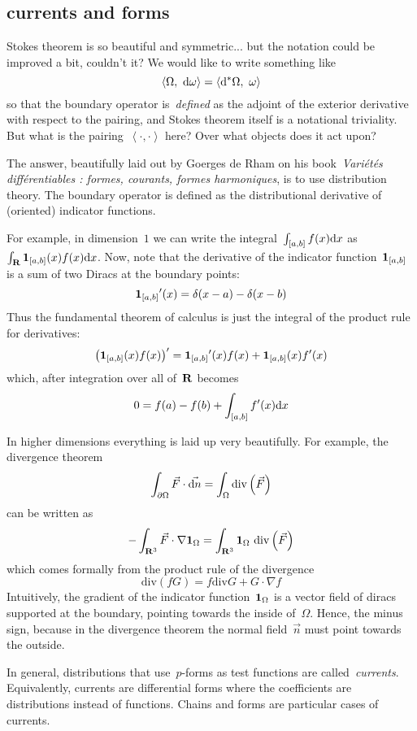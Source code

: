 \clearpage
\subsection{currents and forms}

Stokes theorem is so beautiful and symmetric... but the
notation could be improved a bit, couldn't it?  We would like to write
something like
\[
	\left\langle
	\Omega,\ \mathrm{d}\omega
	\right\rangle
	=
	\left\langle
	\mathrm{d}^*\Omega,\ \omega
	\right\rangle
\]
so that the boundary operator is~\emph{defined} as the adjoint of the
exterior derivative with respect to the pairing, and Stokes theorem itself is
a notational triviality.  But what is the
pairing~$\left\langle\cdot,\cdot\right\rangle$ here?  Over what objects does
it act upon?

The answer, beautifully laid out by Goerges de Rham
on his book~\emph{Variétés différentiables : formes,
courants, formes harmoniques}, is to use distribution theory.  The boundary
operator is defined as the distributional derivative of (oriented) indicator
functions.

For example, in dimension~$1$ we can write the integral~$\int_{[a,b]}f(x)\mathrm{d} x$
as~$\int_{\mathbf{R}}\mathbf{1}_{[a,b]}(x)f(x)\mathrm{d} x$.  Now, note that the derivative of the
indicator function~$\mathbf{1}_{[a,b]}$ is a sum of two Diracs at the boundary points:
\[
	{\mathbf{1}_{[a,b]}}'(x)=\delta(x-a)-\delta(x-b)
\]
Thus the fundamental theorem of calculus is just the integral of the product
rule for derivatives:
\[
	\left(\mathbf{1}_{[a,b]}(x)f(x)\right)'={\mathbf{1}_{[a,b]}}'(x)f(x)+\mathbf{1}_{[a,b]}(x)f'(x)
\]
which, after integration over all of~$\mathbf{R}$ becomes
\[
	0 = f(a)-f(b)+\int_{[a,b]}f'(x)\mathrm{d} x
\]

In higher dimensions everything is laid up very beautifully.  For example,
the divergence theorem
\[
	\int_{\partial\Omega} \vec F\cdot\vec{\mathrm{d} n} =
	\int_\Omega\mathrm{div}\left(\vec F\right)
\]
can be written as
\[
	-\int_{\mathbf{R}^3}
	\vec F\cdot \nabla\mathbf{1}_\Omega
	=
	\int_{\mathbf{R}^3}
	\mathbf{1}_\Omega\ \mathrm{div}\left(\vec F\right)
\]
which comes formally from the product rule of the divergence
\[
	\mathrm{div}\left(fG\right)=f\mathrm{div}G+G\cdot\nabla f
\]
Intuitively, the gradient of the indicator function~$\mathbf{1}_\Omega$ is a vector field of
diracs supported at the boundary, pointing towards the inside of~$\Omega$.
Hence, the minus sign, because in the divergence theorem the normal
field~$\vec n$ must point towards the outside.

In general, distributions that use~$p$-forms as test functions are
called~\emph{currents}.  Equivalently, currents are differential forms where
the coefficients are distributions instead of functions.
Chains and forms are particular cases of currents.

